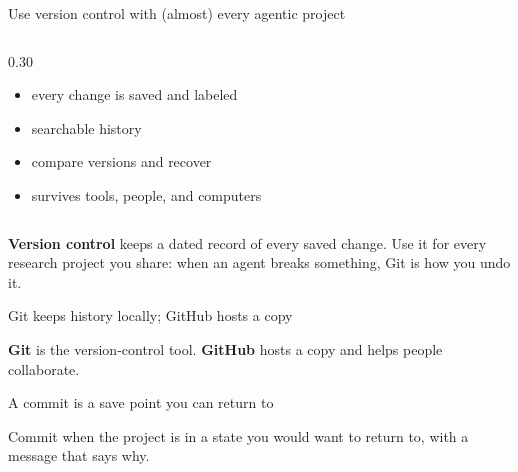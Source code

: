 \begin{frame}{Use version control with (almost) every agentic project}
\begin{columns}[t]
\begin{column}{0.30\textwidth}
\begin{itemize}
        \item every change is saved and labeled
        \item searchable history
        \item compare versions and recover
        \item survives tools, people, and computers
      \end{itemize}
    \end{column}
  \end{columns}
  \vspace{1.1em}
  \begin{center}\small
    \textbf{Version control} keeps a dated record of every saved change. Use it for every
    research project you share: when an agent breaks something, Git is how you undo it.
  \end{center}
  \vspace{0.9cm plus 1fill}
\end{frame}

\begin{frame}{Git keeps history locally; GitHub hosts a copy}
  \vfill
  \begin{center}
    \resizebox{0.94\linewidth}{!}{}
  \end{center}
  \vspace{0.9em}
  \begin{center}\small
    \textbf{Git} is the version-control tool. \textbf{GitHub} hosts a copy and helps people collaborate.
  \end{center}
  \vspace{1.6cm plus 1fill}
\end{frame}

\begin{frame}{A commit is a save point you can return to}
  \vfill
  \begin{center}
    \resizebox{0.94\linewidth}{!}{}
  \end{center}
  \vspace{0.9em}
  \begin{center}\small
    Commit when the project is in a state you would want to return to, with a message that says why.
  \end{center}
  \vspace{1.6cm plus 1fill}
\end{frame}

